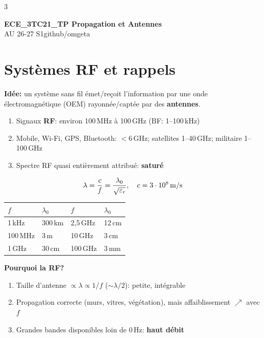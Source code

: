 \documentclass[12pt, a4paper]{article}
\newcommand{\mytitle}{ECE\_3TC21\_TP Propagation et Antennes}
\newcommand{\myauthor}{github/omgeta}
\newcommand{\mydate}{AU 26-27 S1}
\begin{document}
\raggedright
\raggedcolumns
\footnotesize
\begin{multicols*}{3}
	\setlength{\premulticols}{1pt}
	\setlength{\postmulticols}{1pt}
	\setlength{\multicolsep}{1pt}
	\setlength{\columnsep}{2pt}

	{\normalsize{\textbf{\mytitle}}}\\
	{\footnotesize{\mydate\hspace{2pt}\textemdash\hspace{2pt}\myauthor}}

	\section{Systèmes RF et rappels}
	\textbf{Idée:} un système sans fil émet/reçoit l'information par une onde électromagnétique (OEM) rayonnée/captée par des \textbf{antennes}.
	\begin{enumerate}[\roman*.]
		\item Signaux \textbf{RF}: environ 100\,MHz à 100\,GHz (BF: 1--100\,kHz)
		\item Mobile, Wi-Fi, GPS, Bluetooth: $<6$\,GHz; satellites 1--40\,GHz; militaire 1--100\,GHz
		\item Spectre RF quasi entièrement attribué: \textbf{saturé}
	\end{enumerate}
	\begin{gather*}
		\lambda=\frac{c}{f}=\frac{\lambda_0}{\sqrt{\varepsilon_r}},\quad c=3\cdot10^8\text{\,m/s}
	\end{gather*}
	\begin{tabular}{|l|l||l|l|}
		\hline
		$f$     & $\lambda_0$ & $f$     & $\lambda_0$ \\
		\hline
		1\,kHz  & 300\,km     & 2,5\,GHz & 12\,cm      \\
		100\,MHz & 3\,m       & 10\,GHz & 3\,cm       \\
		1\,GHz  & 30\,cm      & 100\,GHz & 3\,mm      \\
		\hline
	\end{tabular}

	\textbf{Pourquoi la RF?}
	\begin{enumerate}[\roman*.]
		\item Taille d'antenne $\propto\lambda\propto1/f$ ($\sim\lambda/2$): petite, intégrable
		\item Propagation correcte (murs, vitres, végétation), mais affaiblissement $\nearrow$ avec $f$
		\item Grandes bandes disponibles loin de 0\,Hz: \textbf{haut débit}
	\end{enumerate}


\end{multicols*}
\end{document}
